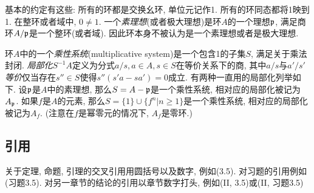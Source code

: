 基本的约定有这些: 所有的环都是交换幺环, 单位元记作1. 所有的环同态都将1映到1. 在整环或者域中, $0\neq 1$. 一个\emph{素理想}(或者极大理想)是环$A$的一个理想$\mathfrak{p}$, 满足商环$A/\mathfrak{p}$是一个整环(或者域). 因此环本身不被认为是一个素理想或者是极大理想.

环$A$中的一个\emph{乘性系统}(multiplicative system)是一个包含1的子集$S$, 满足关于乘法封闭. \emph{局部化}$S^{-1}A$定义为分式$a/s, a\in A, s\in S$在等价关系下的商, 其中$a/s$与$a'/s'$\emph{等价}仅当存在$s''\in S$使得$s''(s'a-sa')=0$成立. 有两种一直用的局部化列举如下. 设$\mathfrak{p}$是$A$中的素理想, 那么$S = A - \mathfrak{p}$是一个乘性系统, 相对应的局部化被记为$A_{\mathfrak{p}}$. 如果$f$是$A$的元素, 那么$S = \{1\}\cup \{f^n\vert n\geq 1\}$是一个乘性系统, 相对应的局部化被记为$A_f$. (注意在$f$是幂零元的情况下, $A_f$是零环.)

\subsection*{引用}

关于定理, 命题, 引理的交叉引用用圆括号以及数字, 例如(3.5). 对习题的引用例如(习题3.5). 对另一章节的结论的引用以章节数字打头, 例如(II, 3.5)或(II, 习题3.5)

